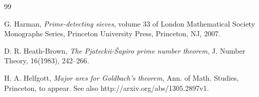 \documentclass{amsart}
\numberwithin{equation}{subsection}
\begin{document}
\begin{thebibliography}{99}









  G. Harman, \textit{Prime-detecting sieves}, volume 33 of London  Mathematical  Society Monographs Series, Princeton University Press, Princeton, NJ, 2007.

 D. R. Heath-Brown, \textit{The Pjateckii-\v{S}apiro prime number theorem}, J. Number Theory, 16(1983), 242--266.


 H. A. Helfgott, \textit{Major arcs for Goldbach's theorem},  Ann. of Math. Studies, Princeton, to appear. See also http://arxiv.org/abs/1305.2897v1.






\end{thebibliography}
\end{document}
